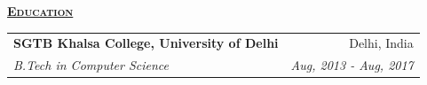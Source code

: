 \documentclass[11pt, a4paper]{article}
\begin{document}
\begin{flushleft}
    \uline{\textsc{\large{\textbf{Education}}}\hfill}
    \newline
    \newline
    \setlength\tabcolsep{0pt}
    \begin{tabularx}{\textwidth}{X r}
        \large{\textbf{SGTB Khalsa College, University of Delhi}} & Delhi, India \\
        \textit{B.Tech in Computer Science} & \textit{Aug, 2013 - Aug, 2017} \\
    \end{tabularx}
    \newline
\end{flushleft}
\end{document}
